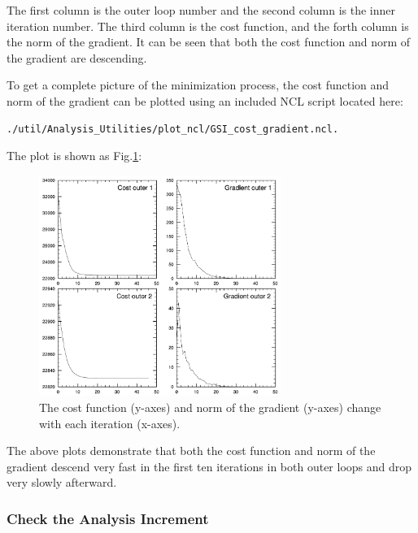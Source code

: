 The first column is the outer loop number and the second column is the inner iteration number.  The third column is the cost function, and the forth column is the norm of the gradient.  It can be seen that both the cost function and norm of the gradient are descending.

To get a complete picture of the minimization process, the cost function and norm of the gradient can be plotted using an included NCL script located here: 

\begin{scriptsize}
\begin{verbatim}
./util/Analysis_Utilities/plot_ncl/GSI_cost_gradient.ncl.
\end{verbatim}
\end{scriptsize}

The plot is shown as Fig.\ref{fig:costgrad_ch5}:

\begin{figure}[h!]
  \centering
  \includegraphics[width=0.7\textwidth]{images/CostGrad_ch5}
  \caption{The cost function (y-axes) and norm of the gradient (y-axes) change with each iteration (x-axes).}
  \label{fig:costgrad_ch5}
\end{figure}

The above plots demonstrate that both the cost function and norm of the gradient descend very fast in the first ten iterations in both outer loops and drop very slowly afterward.

\subsubsection{Check the Analysis Increment}
\label{sec5.1.4.3}

